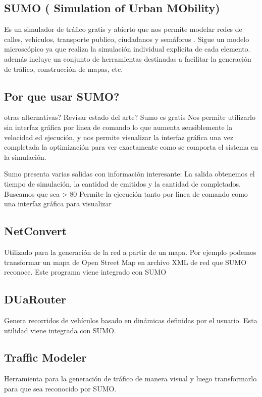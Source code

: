 \subsection{SUMO ( Simulation of Urban MObility)}

Es un simulador de tráfico gratis y abierto que nos permite modelar redes de calles, vehículos, transporte publico, ciudadanos y semáforos \citep{SUMO}. Sigue un modelo microscópico ya que realiza la simulación individual explicita de cada elemento. además incluye un conjunto de herramientas destinadas  a facilitar la generación de tráfico, construcción de mapas, etc. 


\subsection{Por que usar SUMO? }
otras alternativas? Revisar estado del arte?
Sumo es gratis
Nos permite utilizarlo sin interfaz gráfica por linea de comando lo que aumenta sensiblemente la velocidad ed ejecución, y  nos permite visualizar la interfaz gráfica una vez completada la optimización para ver exactamente como se comporta el sistema en la simulación.

Sumo presenta varias salidas con información interesante: \citep{SUMOOUT} 
La salida obtenemos el tiempo de simulación, la cantidad de emitidos y la cantidad de completados. Buscamos que sea > 80%
Permite la ejecución tanto por linea de comando como una interfaz gráfica para visualizar

\subsection{NetConvert}
Utilizado para la generación de la red a partir de un mapa. Por ejemplo podemos transformar un mapa de Open Street Map en archivo XML de red que SUMO reconoce. Este programa viene integrado con SUMO

\subsection{DUaRouter}
Genera recorridos de vehículos basado en dinámicas definidas por el usuario. Esta utilidad viene integrada con SUMO.

\subsection{Traffic Modeler}
Herramienta para la generación de tráfico de manera visual y luego transformarlo para que sea reconocido por SUMO. \citep{TrafficModeler}

